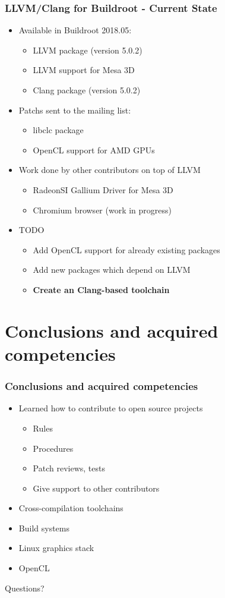 \documentclass{smilebeamer}
\begin{document}
\begin{frame}
\frametitle{LLVM/Clang for Buildroot - Current State}
\begin{itemize}
  \item Available in Buildroot 2018.05:
  \begin{itemize}
    \item LLVM package (version 5.0.2)\checkmark
    \item LLVM support for Mesa 3D \checkmark
    \item Clang package (version 5.0.2)\checkmark
  \end{itemize}
  \item Patchs sent to the mailing list:
  \begin{itemize}
    \item libclc package
    \item OpenCL support for AMD GPUs
  \end{itemize}
  \item Work done by other contributors on top of LLVM
  \begin{itemize}
    \item RadeonSI Gallium Driver for Mesa 3D
    \item Chromium browser (work in progress)
  \end{itemize}
  \item TODO
  \begin{itemize}
    \item Add OpenCL support for already existing packages
    \item Add new packages which depend on LLVM
    \item \textbf{Create an Clang-based toolchain}
  \end{itemize}
\end{itemize}
\end{frame}

\section{Conclusions and acquired competencies}

\begin{frame}
\frametitle{Conclusions and acquired competencies}
\begin{itemize}
  \item Learned how to contribute to open source projects \checkmark
  \begin{itemize}
    \item Rules
    \item Procedures
    \item Patch reviews, tests
    \item Give support to other contributors
  \end{itemize}
  \item Cross-compilation toolchains \checkmark
  \item Build systems \checkmark
  \item Linux graphics stack \checkmark
  \item OpenCL \checkmark
\end{itemize}
\end{frame}

\begin{frame}
\Huge{\centerline{Questions?}}
\end{frame}
\end{document}
